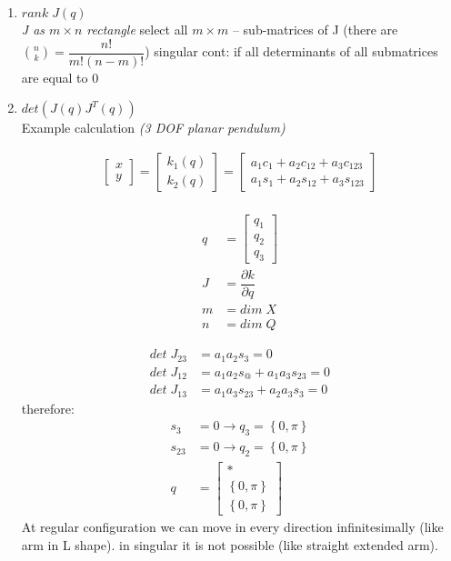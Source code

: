 \documentclass[12pt, a4paper]{extarticle}
\begin{document}
	\begin{enumerate}
		\item $rank\; J(q)$\\
		\textit{J as $m \times n$ rectangle}
		select all $m \times m$ -- sub-matrices of J (there are $\binom{n}{k} = \dfrac{n!}{m! (n-m)!}$)
		singular cont: if all determinants of all submatrices are equal to 0
		\item $det\left(J(q) J^T(q)\right)$\\
		Example calculation \textit{(3 DOF planar pendulum)}
		\begin{multicols}{2}
				\begin{align}
				\begin{bmatrix}
					x\\
					y
				\end{bmatrix} =
				\begin{bmatrix}
					k_1(q)\\
					k_2(q)
				\end{bmatrix} =
				\begin{bmatrix}
					a_1 c_1 + a_2 c_{12} + a_3 c_{123} \\
					a_1 s_1 + a_2 s_{12} + a_3 s_{123}
				\end{bmatrix}
			\end{align}
			\\
			\begin{align}
				q &=
				\begin{bmatrix}
					q_1 \\ q_2 \\ q_3
				\end{bmatrix} \\
				J &= \dfrac{\partial k}{\partial q} \\
				m &= dim\; X \\
				n &= dim\; Q
			\end{align}
		\end{multicols}
		\begin{align}
			det\;J_{23} &= a_1 a_2 s_3 = 0\\
			det\;J_{12} &= a_1 a_2 s_@ + a_1 a_3 s_{23} = 0\\
			det\;J_{13} &= a_1 a_3 s_{23} + a_2 a_3 s_3 = 0
		\end{align}
		therefore:
		\begin{align}
			s_3 &= 0 \rightarrow q_3 = \left\{0, \pi\right\} \\
			s_{23} &= 0 \rightarrow q_2 = \left\{0, \pi\right\} \\
			q &= \begin{bmatrix}
				* \\
				\left\{0, \pi\right\} \\
				\left\{0, \pi\right\}
			\end{bmatrix}
		\end{align}
		At regular configuration we can move in every direction infinitesimally (like arm in L shape). in singular it is not possible	(like straight extended arm).\\


	\end{enumerate}
\end{document}
